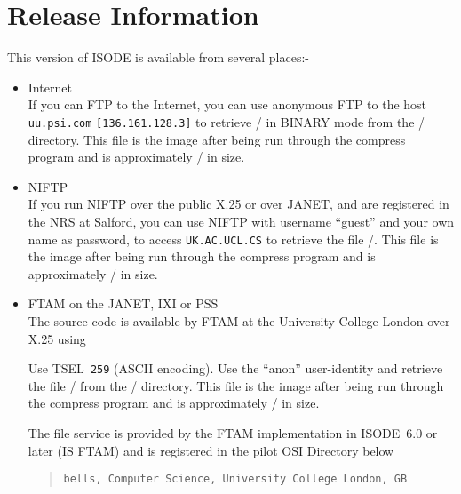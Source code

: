 \section*	{Release Information}
This version of ISODE is available from several places:-
\begin{itemize}

\item	Internet\\
If you can FTP to the Internet,
you can use anonymous FTP to the host \verb"uu.psi.com"
\verb"[136.161.128.3]"
to retrieve \compressfile/ in BINARY mode from the \tarplace/ directory.
This file is the  image after being run through the compress program
and is approximately \compressize/ in size.

\item	NIFTP\\
If you run NIFTP over the public X.25 or over JANET, and are
registered in the NRS at Salford, you can use NIFTP with username
``guest'' and your own name as password, to access \verb"UK.AC.UCL.CS" to
retrieve the file \ukcompressfile/.
This file is the  image after being run through the compress program
and is approximately \compressize/ in size.

\item	FTAM on the JANET, IXI or PSS\\
The source code is available by FTAM at the University College London
over X.25 using 
Use TSEL~\verb"259" (ASCII encoding).
Use the ``anon'' user-identity and retrieve the file 
\compressfile/ from the \uktarplace/ directory.
This file is the  image after being run through the compress program
and is approximately \compressize/ in size.

The file service is provided by the FTAM implementation in ISODE~6.0 or later
(IS FTAM) and is registered in the pilot OSI Directory below
\begin{quote}\footnotesize\begin{verbatim}
bells, Computer Science, University College London, GB
\end{verbatim}\end{quote}

\end{itemize}

